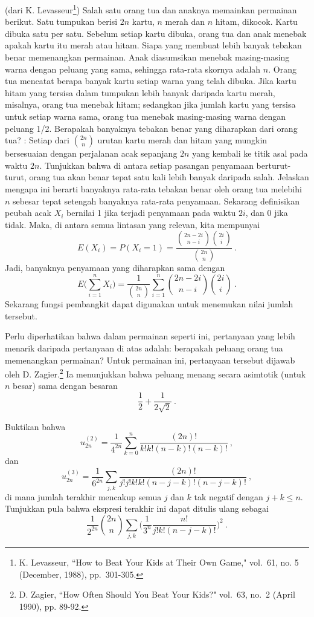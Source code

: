 \begin{LJSItem}
\istar\label{exer 12.1.10}
(dari K. Levasseur\footnote{K. Levasseur, ``How to Beat Your Kids at Their
Own Game,"  vol.~61, no. 5 (December, 1988),
pp.~301-305.}) Salah satu orang tua dan anaknya memainkan
permainan berikut. Satu tumpukan berisi $2n$ kartu, $n$ merah dan $n$ hitam,
dikocok. Kartu dibuka satu per satu. Sebelum setiap kartu dibuka, orang tua dan
anak menebak apakah kartu itu merah atau hitam. Siapa yang membuat lebih banyak
tebakan benar memenangkan permainan. Anak diasumsikan menebak masing-masing
warna dengan peluang yang sama, sehingga rata-rata skornya adalah $n$. Orang
tua mencatat berapa banyak kartu setiap warna yang telah dibuka. Jika kartu
hitam yang tersisa dalam tumpukan lebih banyak daripada kartu merah, misalnya,
orang tua menebak hitam; sedangkan jika jumlah kartu yang tersisa untuk setiap
warna sama, orang tua menebak masing-masing warna dengan peluang 1/2. Berapakah
banyaknya tebakan benar yang diharapkan dari orang tua? : Setiap
dari ${{2n}\choose n}$ urutan kartu merah dan hitam yang mungkin bersesuaian
dengan perjalanan acak sepanjang $2n$ yang kembali ke titik asal pada waktu
$2n$. Tunjukkan bahwa di antara setiap pasangan penyamaan berturut-turut, orang
tua akan benar tepat satu kali lebih banyak daripada salah. Jelaskan mengapa
ini berarti banyaknya rata-rata tebakan benar oleh orang tua melebihi $n$
sebesar tepat setengah banyaknya rata-rata penyamaan. Sekarang definisikan
peubah acak $X_i$ bernilai 1 jika terjadi penyamaan pada waktu $2i$, dan 0 jika
tidak. Maka, di antara semua lintasan yang relevan, kita mempunyai
$$E(X_i) = P(X_i = 1) = \frac{{{2n-2i}\choose{n-i}}{{2i}\choose{i}}}{{{2n}\choose{n}}}\ .$$
Jadi, banyaknya penyamaan yang diharapkan sama dengan
$$E\biggl(\sum_{i = 1}^n X_i\biggr) = \frac 1{{{2n}\choose{n}}}\sum_{i = 1}^n 
{{2n-2i}\choose{n-i}}{{2i}\choose{i}}\ .$$
Sekarang fungsi pembangkit dapat digunakan untuk menemukan nilai jumlah tersebut.
\par
Perlu diperhatikan bahwa dalam permainan seperti ini, pertanyaan yang lebih
menarik daripada pertanyaan di atas adalah: berapakah peluang orang tua
memenangkan permainan? Untuk permainan ini, pertanyaan tersebut dijawab oleh
D. Zagier.\footnote{D. Zagier, ``How Often Should You Beat Your Kids?"
 vol.~63, no.\ 2 (April 1990), pp. 89-92.}
 Ia menunjukkan bahwa peluang menang secara asimtotik (untuk
$n$ besar) sama dengan besaran
$$\frac 12 + \frac 1{2\sqrt 2}\ .$$

\item\label{exer 12.1.11}
Buktikan bahwa
$$u^{(2)}_{2n} = \frac 1{4^{2n}} \sum_{k = 0}^n \frac {(2n)!}{k!k!(n-k)!(n-k)!}\ ,$$
dan
$$u^{(3)}_{2n} = \frac 1{6^{2n}} \sum_{j,k} \frac {(2n)!}{j!j!k!k!(n-j-k)!(n-j-k)!}\ ,$$
di mana jumlah terakhir mencakup semua $j$ dan $k$ tak negatif dengan
$j+k \le n$. Tunjukkan pula bahwa ekspresi terakhir ini dapat ditulis ulang sebagai
$$\frac 1{2^{2n}}{{2n}\choose n} \sum_{j,k} 
\biggl(\frac 1{3^n}\frac{n!}{j!k!(n-j-k)!}\biggr)^2\ .$$


\end{LJSItem}
